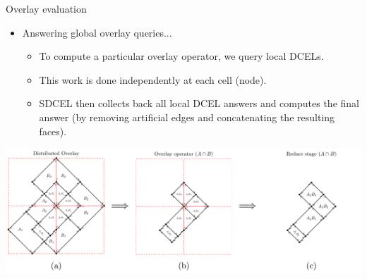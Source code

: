    \begin{frame}{Overlay evaluation}
        \begin{itemize}
            \item Answering global overlay queries...
            \begin{itemize}
                \item To compute a particular overlay operator, we query local DCELs.
                \item This work is done independently at each cell (node).
                \item SDCEL then collects back all local DCEL answers and computes the final answer (by removing artificial edges and concatenating the resulting faces).
            \end{itemize}
        \end{itemize}
        \vspace{0.5cm}

        \centering
        \includegraphics[width=\textwidth]{../thesis/chapterSDCEL/overlay_operator}
    \end{frame}


